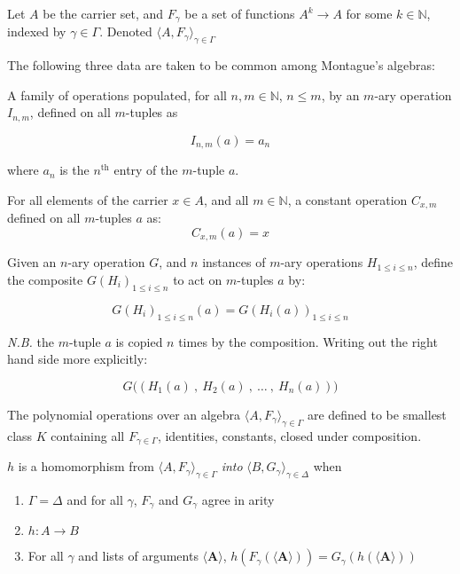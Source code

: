 \begin{defn}\label{algdata} 
Let $A$ be the carrier set, and $F_\gamma$ be a set of functions $A^k \rightarrow A$ for some $k \in \mathbb{N}$, indexed by $\gamma \in \Gamma$. Denoted $\langle A, F_\gamma \rangle_{\gamma \in \Gamma}$
\end{defn}

The following three data are taken to be common among Montague's algebras:

\begin{defn}[Identities]\label{ids} 
A family of operations populated, for all $n, m \in \mathbb{N}$, $n \leq m$, by an $m$-ary operation $I_{n,m}$, defined on all $m$-tuples as

$$I_{n,m}(a) = a_n$$

where $a_n$ is the $n^{\text{th}}$ entry of the $m$-tuple $a$.
\end{defn}


\begin{defn}[Constants]\label{constants}
For all elements of the carrier $x \in A$, and all $m \in \mathbb{N}$, a constant operation $C_{x,m}$ defined on all $m$-tuples $a$ as:
$$C_{x,m}(a) = x$$
\end{defn}

\begin{defn}[Composition]\label{comp}
Given an $n$-ary operation $G$, and $n$ instances of $m$-ary operations $H_{1 \leq i \leq n}$, define the composite $G(H_i)_{1 \leq i \leq n}$ to act on $m$-tuples $a$ by:

$$G(H_i)_{1 \leq i \leq n}(a) = G(H_i(a))_{1 \leq i \leq n}$$

\emph{N.B.} the $m$-tuple $a$ is copied $n$ times by the composition. Writing out the right hand side more explicitly:

$$G\bigg( \ \big( \ H_1(a) \ , \ H_2(a) \ , \ \ldots \ , \ H_n(a) \ \big) \  \bigg)$$
\end{defn}

\begin{defn}\label{polyop}
The polynomial operations over an algebra $\langle A, F_\gamma \rangle_{\gamma \in \Gamma}$ are defined to be smallest class $K$ containing all $F_{\gamma \in \Gamma}$, identities, constants, closed under composition.
\end{defn}

\begin{defn}\label{homo}
$h$ is a homomorphism from $\langle A, F_\gamma \rangle_{\gamma \in \Gamma}$ \emph{into} $\langle B, G_\gamma \rangle_{\gamma \in \Delta}$ when
\begin{enumerate}
    \item{$\Gamma = \Delta$ and for all $\gamma$, $F_\gamma$ and $G_\gamma$ agree in arity}
    \item{$h: A \rightarrow B$}
    \item{For all $\gamma$ and lists of arguments $\langle \mathbf{A} \rangle$, $h(F_\gamma(\langle \mathbf{A} \rangle)) = G_\gamma(h(\langle \mathbf{A} \rangle))$}
\end{enumerate}
\end{defn}


